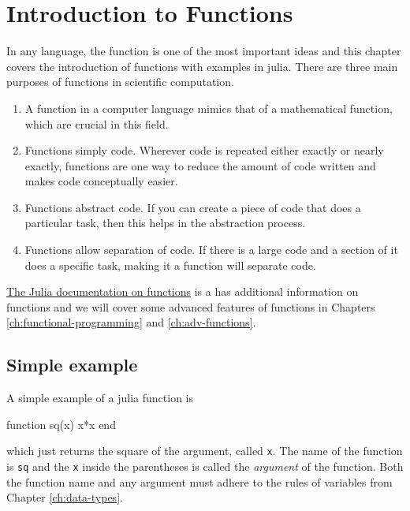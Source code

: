 
\hypertarget{ch:intro-functions}{%
\chapter{Introduction to Functions}\label{ch:intro-functions}}

In any language, the function is one of the most important ideas and
this chapter covers the introduction of functions with examples in julia. There are three main purposes of functions in scientific computation.  
\begin{enumerate}
\item A function in a computer language mimics that of a mathematical function, which are crucial in this field.
\item Functions simply code.  Wherever code is repeated either exactly or nearly exactly, functions are one way to reduce the amount of code written and makes code conceptually easier. 
\item Functions abstract code.  If you can create a piece of code that does a particular task, then this helps in the abstraction process. 
\item Functions allow separation of code.  If there is a large code and a section of it does a specific task, making it a function will separate code.  
\end{enumerate}


\href{http://docs.julialang.org/en/latest/manual/functions/}{The Julia documentation on functions} is a has additional information on functions and we will cover some advanced features of functions in Chapters \ref{ch:functional-programming} and \ref{ch:adv-functions}.  

\hypertarget{simple-example}{%
\section{Simple example}\label{simple-example}}

A simple example of a julia function is
%
\begin{jlblock}[functions]
function sq(x)
  x*x
end
\end{jlblock}
%
which just returns the square of the argument, called \texttt{x}.  The name of the function is \texttt{sq} and the \texttt{x} inside the parentheses is called the \emph{argument} of the function.  Both the function name and any argument must adhere to the rules of variables from Chapter \ref{ch:data-types}.  


